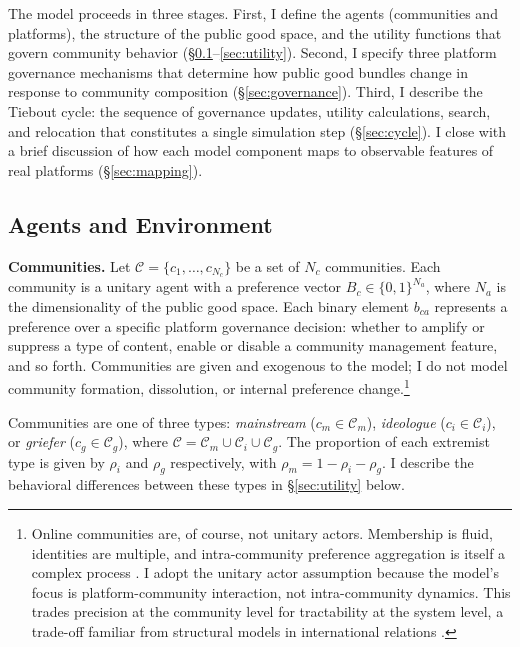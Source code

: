 \documentclass[12pt]{article}
\begin{document}
The model proceeds in three stages. First, I define the agents (communities and platforms), the structure of the public good space, and the utility functions that govern community behavior (\S\ref{sec:agents}--\ref{sec:utility}). Second, I specify three platform governance mechanisms that determine how public good bundles change in response to community composition (\S\ref{sec:governance}). Third, I describe the Tiebout cycle: the sequence of governance updates, utility calculations, search, and relocation that constitutes a single simulation step (\S\ref{sec:cycle}). I close with a brief discussion of how each model component maps to observable features of real platforms (\S\ref{sec:mapping}).

\subsection{Agents and Environment}
\label{sec:agents}

\textbf{Communities.} Let $\mathcal{C} = \{c_1, \ldots, c_{N_c}\}$ be a set of $N_c$ communities. Each community is a unitary agent with a preference vector $B_c \in \{0,1\}^{N_a}$, where $N_a$ is the dimensionality of the public good space. Each binary element $b_{ca}$ represents a preference over a specific platform governance decision: whether to amplify or suppress a type of content, enable or disable a community management feature, and so forth. Communities are given and exogenous to the model; I do not model community formation, dissolution, or internal preference change.\footnote{Online communities are, of course, not unitary actors. Membership is fluid, identities are multiple, and intra-community preference aggregation is itself a complex process \citep{stryker2004integrating, stets2000identity}. I adopt the unitary actor assumption because the model's focus is platform-community interaction, not intra-community dynamics. This trades precision at the community level for tractability at the system level, a trade-off familiar from structural models in international relations \citep{waltzEvaluatingTheories1997}.}

Communities are one of three types: \textit{mainstream} ($c_m \in \mathcal{C}_m$), \textit{ideologue} ($c_i \in \mathcal{C}_i$), or \textit{griefer} ($c_g \in \mathcal{C}_g$), where $\mathcal{C} = \mathcal{C}_m \cup \mathcal{C}_i \cup \mathcal{C}_g$. The proportion of each extremist type is given by $\rho_i$ and $\rho_g$ respectively, with $\rho_m = 1 - \rho_i - \rho_g$. I describe the behavioral differences between these types in \S\ref{sec:utility} below.
\end{document}
